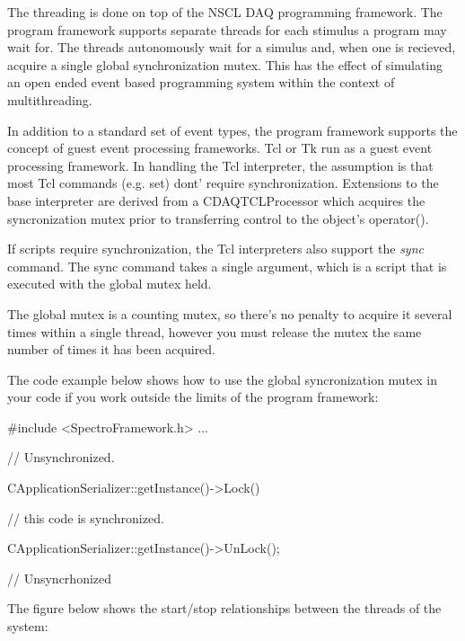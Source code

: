       The threading is done on top of the
      NSCL DAQ programming framework.   %
      The program framework supports separate threads for each stimulus
      a program may wait for.  The threads autonomously wait for a simulus
      and, when one is recieved, acquire a single global synchronization
      mutex.  This has the effect of simulating an open ended event 
      based programming system within the context of multithreading.
      
      In addition to a standard set of event types, the program framework
      supports the concept of guest event processing frameworks.  Tcl or
      Tk run as a guest event processing framework. In handling the Tcl 
      interpreter, the assumption is that most Tcl commands (e.g. set) 
      dont' require synchronization.  Extensions to the base interpreter
      are derived from a CDAQTCLProcessor which acquires the syncronization
      mutex prior to transferring control to the object's operator().
      
      If scripts require synchronization, the Tcl interpreters also support
      the {\em sync} command.   The sync command takes a single argument,
      which is a script that is executed with the global mutex held.
      
      The global mutex is a counting mutex, so there's no penalty to 
      acquire it several times within a single thread, however you must
      release the mutex the same number of times it has been acquired.
      
      The code example below shows how to use the global syncronization
      mutex in your code if you work outside the limits of the program
      framework:
      
      \begin{example}
      #include <SpectroFramework.h>
      ...
      
      // Unsynchronized.
      
      CApplicationSerializer::getInstance()->Lock() 
      
      // this code is synchronized.
      
      CApplicationSerializer::getInstance()->UnLock();
      
      // Unsyncrhonized
      \end{example}
      
      The figure below shows the start/stop relationships between the 
      threads of the system:
      
